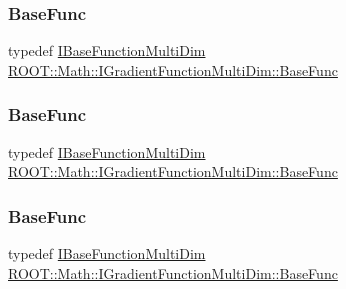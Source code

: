 \subsubsection{\texorpdfstring{BaseFunc}{BaseFunc}\hspace{0.1cm}{\footnotesize\ttfamily [1/3]}}
{\footnotesize\ttfamily typedef \mbox{\hyperlink{classROOT_1_1Math_1_1IBaseFunctionMultiDim}{I\+Base\+Function\+Multi\+Dim}} \mbox{\hyperlink{classROOT_1_1Math_1_1IGradientFunctionMultiDim_a803074495bafb5acf9f130b648001609}{R\+O\+O\+T\+::\+Math\+::\+I\+Gradient\+Function\+Multi\+Dim\+::\+Base\+Func}}}

\mbox{\label{classROOT_1_1Math_1_1IGradientFunctionMultiDim_a803074495bafb5acf9f130b648001609}} 
\subsubsection{\texorpdfstring{BaseFunc}{BaseFunc}\hspace{0.1cm}{\footnotesize\ttfamily [2/3]}}
{\footnotesize\ttfamily typedef \mbox{\hyperlink{classROOT_1_1Math_1_1IBaseFunctionMultiDim}{I\+Base\+Function\+Multi\+Dim}} \mbox{\hyperlink{classROOT_1_1Math_1_1IGradientFunctionMultiDim_a803074495bafb5acf9f130b648001609}{R\+O\+O\+T\+::\+Math\+::\+I\+Gradient\+Function\+Multi\+Dim\+::\+Base\+Func}}}

\mbox{\label{classROOT_1_1Math_1_1IGradientFunctionMultiDim_a803074495bafb5acf9f130b648001609}} 
\subsubsection{\texorpdfstring{BaseFunc}{BaseFunc}\hspace{0.1cm}{\footnotesize\ttfamily [3/3]}}
{\footnotesize\ttfamily typedef \mbox{\hyperlink{classROOT_1_1Math_1_1IBaseFunctionMultiDim}{I\+Base\+Function\+Multi\+Dim}} \mbox{\hyperlink{classROOT_1_1Math_1_1IGradientFunctionMultiDim_a803074495bafb5acf9f130b648001609}{R\+O\+O\+T\+::\+Math\+::\+I\+Gradient\+Function\+Multi\+Dim\+::\+Base\+Func}}}

